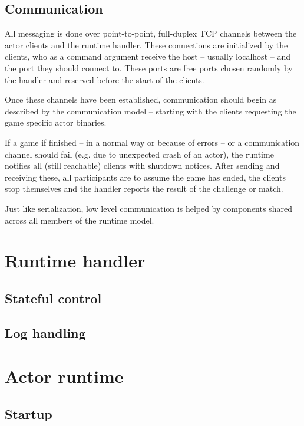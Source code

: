 \documentclass[11pt,a4paper,oneside]{report}
\begin{document}
		\subsection{Communication}
		
		All messaging is done over point-to-point, full-duplex TCP channels between the actor clients and the runtime handler. These connections are initialized by the clients, who as a command argument receive the host -- usually localhost -- and the port they should connect to. These ports are free ports chosen randomly by the handler and reserved before the start of the clients.
		
		Once these channels have been established, communication should begin as described by the communication model -- starting with the clients requesting the game specific actor binaries.
		
		If a game if finished -- in a normal way or because of errors -- or a communication channel should fail (e.g. due to unexpected crash of an actor), the runtime notifies all (still reachable) clients with shutdown notices. After sending and receiving these, all participants are to assume the game has ended, the clients stop themselves and the handler reports the result of the challenge or match.

		Just like serialization, low level communication is helped by components shared across all members of the runtime model.

	\section{Runtime handler}

		\subsection{Stateful control}

		\subsection{Log handling}

	\section{Actor runtime}

		\subsection{Startup}
\end{document}
